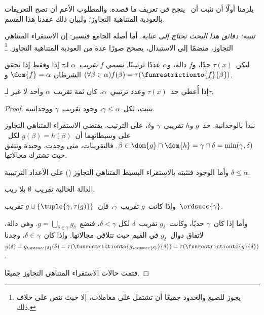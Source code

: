 \documentclass[../../../include/open-logic-section]{subfiles}
\begin{document}

يلزمنا أولًا أن نثبت أن~ ينجح في تعريف
ما قصده. والمطلوب الأعم أن تصح التعريفات بالعودية المتناهية التجاوز؛
ولبيان ذلك عقدنا هذا القسم.

\emph{تنبيه: دقائق هذا البحث تحتاج إلى عناية}. أما أصله الجامع
فيسير: إن الاستقراء المتناهي التجاوز، منضمًا إلى الاستبدال، يصحح
صورًا عدة من العودية المتناهية التجاوز.
\footnote{يجوز للصيغ والحدود جميعًا أن تشتمل على معاملات، إلا حيث
ننص على خلاف ذلك.}

\begin{defn}
ليكن~$\tau(x)$ حدًا، و$f$ دالة، و$\alpha$ عددًا ترتيبيًا. نسمي
$f$ \emph{تقريب~$\alpha$} لـ$\tau$ إذا وفقط إذا تحقق الشرطان
$\dom{f} = \alpha$ و
$(\forall \beta \in \alpha)f(\beta) = \tau(\funrestrictionto{f}{\beta})$.
\end{defn}

\begin{lem}
إذا أُعطي حد~$\tau(x)$ وعدد ترتيبي~$\alpha$، كان ثمة تقريب~$\alpha$
واحد لا غير لـ$\tau$.
\end{lem}
\begin{proof}
نثبت، لكل~$\gamma \leq \alpha$، وجود تقريب~$\gamma$ ووحدانيته.

نبدأ بالوحدانية. خذ~$g$ و$h$ تقريبي~$\gamma$ و$\delta$، على الترتيب.
يقتضي الاستقراء المتناهي التجاوز على وسيطاتهما أن~$g(\beta) = h(\beta)$
لكل~$\beta \in \dom{g} \cap \dom{h} = \gamma \cap \delta = \min(\gamma, \delta)$.
فالتقريبات، متى وجدت، وحيدة وتتفق حيث تشترك مجالاتها.

وأما الوجود فنثبته بالاستقراء البسيط المتناهي التجاوز
() على الأعداد الترتيبية
$\delta \leq \alpha$.

الدالة الخالية تقريب~$\emptyset$ بلا ريب.

وإذا كانت~$g$ تقريب~$\gamma$، فإن~$g \cup \{\tuple{\gamma, \tau(g)}\}$
تقريب~$\ordsucc{\gamma}$.

وأما إذا كان~$\gamma$ حديًا، وكانت~$g_\delta$ تقريب~$\delta$ لكل
$\delta < \gamma$، فنضع~$g = \bigcup_{\delta \in \gamma} g_\delta$.
وهي دالة، لاتفاق دوال~$g_\delta$ في القيم حيث تتلاقى مجالاتها.
وإذا كان~$\delta \in \gamma$، وجدنا
$g(\delta) = g_{\ordsucc{\delta}}(\delta) =
\tau(\funrestrictionto{g_{\ordsucc{\delta}}}{\delta}) =
\tau(\funrestrictionto{g}{\delta})$.

فتمت حالات الاستقراء المتناهي التجاوز جميعًا.
\end{proof}
\end{document}

